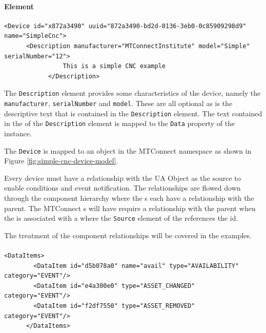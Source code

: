 \paragraph{ Element}

\begin{lstlisting}[firstnumber=last,%
    caption={\texttt{Device} Element Mapping},label={lst:device-model-device}]
    <Device id="x872a3490" uuid="872a3490-bd2d-0136-3eb0-0c85909298d9" name="SimpleCnc">
      <Description manufacturer="MTConnectInstitute" model="Simple" serialNumber="12">
				This is a simple CNC example
			</Description>
\end{lstlisting}

The \texttt{Description} element provides some characteristics of the device, namely the \texttt{manufacturer}, \texttt{serialNumber} and \texttt{model}. These are all optional as is the descriptive text that is contained in the \texttt{Description} element. The text contained in the  of the \texttt{Description} element is mapped to the \texttt{Data} property of the  instance.

The \texttt{Device} is mapped to an  object in the MTConnect namespace as shown in Figure \ref{fig:simple-cnc-device-model}.



Every device must have a  relationship with the  UA Object as the source to enable conditions and event notification. The  relationships are flowed down through the component hierarchy where the s each have a  relationship with the parent. The MTConnect s will have require a  relationship with the parent  when the  is associated with a  where the \texttt{Source} element of the  references the  id. 

The treatment of the component relationships will be covered in the  examples.

\paragraph{ }

\begin{lstlisting}[firstnumber=last,%
    caption={Device Data Items},label={lst:device-data-items}]
      <DataItems>
        <DataItem id="d5b078a0" name="avail" type="AVAILABILITY" category="EVENT"/>
        <DataItem id="e4a300e0" type="ASSET_CHANGED" category="EVENT"/>
        <DataItem id="f2df7550" type="ASSET_REMOVED" category="EVENT"/>
      </DataItems>
\end{lstlisting}

